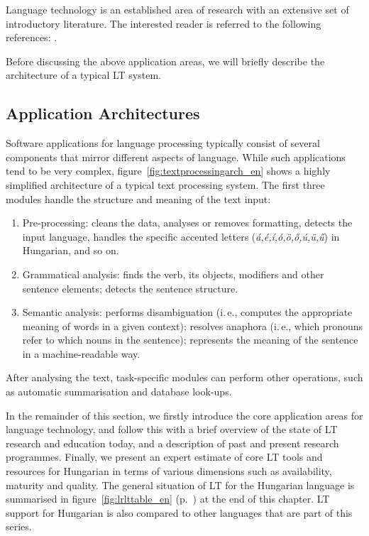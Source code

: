 \begin{multicols}{2}
Language technology is an established area of research with an extensive set of introductory literature. The interested reader is referred to the following references:  \cite{jurafsky-martin01, manning-schuetze1, lt-world1, lt-survey1}.

Before discussing the above application areas, we will briefly describe the architecture of a typical LT system.

\subsection{Application Architectures}

Software applications for language processing typically consist of several components that mirror different aspects of language. While such applications tend to be very complex, figure~\ref{fig:textprocessingarch_en} shows a highly simplified architecture of a typical text processing system. The first three modules handle the structure and meaning of the text input:

\begin{enumerate}
\item Pre-processing: cleans the data, analyses or removes formatting, detects the input language, handles the specific accented letters (\textit{á,é,í,ó,ö,ő,ú,ü,ű}) in Hungarian, and so on.
\item Grammatical analysis: finds the verb, its objects, modifiers and other sentence elements; detects the sentence structure.
\item Semantic analysis: performs disambiguation (i.\,e., computes the appropriate meaning of words in a given context); resolves anaphora (i.\,e., which pronouns refer to which nouns in the sentence); represents the meaning of the sentence in a machine-readable way.
\end{enumerate}

After analysing the text, task-specific modules can perform other operations, such as automatic summarisation and database look-ups.

In the remainder of this section, we firstly introduce the core application areas for language technology, and follow this with a brief overview of the state of LT research and education today, and a description of past and present research programmes. Finally, we present an expert estimate of core LT tools and resources for Hungarian in terms of various dimensions such as availability, maturity and quality. The general situation of LT for the Hungarian language is summarised in figure~\ref{fig:lrlttable_en} (p.~\pageref{fig:lrlttable_en}) at the end of this chapter. LT support for Hungarian is also compared to other languages that are part of this series.


\end{multicols}
